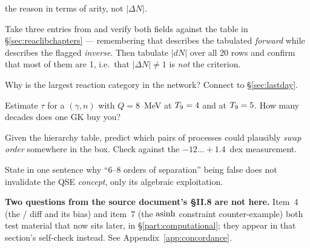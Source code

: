 \begin{selfcheck}
      the reason in terms of arity, not $|\Delta N|$.
\item Take three entries from
       and verify both fields
      against the table in \S\ref{sec:reaclibchapters} --- remembering that
       describes the tabulated \emph{forward} while 
      describes the flagged \emph{inverse}. Then tabulate $|dN|$ over all 20
      rows and confirm that most of them are 1, i.e.\ that
      $|\Delta N| \neq 1$ is \emph{not} the criterion.
\item Why is  the largest reaction category in the network? Connect
      to \S\ref{sec:lastday}.
\item Estimate $\tau$ for a $(\gamma,n)$ with $Q = 8$~MeV at $T_{9} = 4$ and at
      $T_{9} = 5$. How many decades does one GK buy you?
\item Given the hierarchy table, predict which pairs of processes could
      plausibly \emph{swap order} somewhere in the box. Check against the
      $-12\ldots+1.4$~dex measurement.
\item State in one sentence why ``6--8 orders of separation'' being false does
      not invalidate the QSE \emph{concept}, only its algebraic exploitation.
\end{selfcheck}

\begin{aside}
\textbf{Two questions from the source document's \S II.8 are not here.} Item~4
(the / diff and its \Ye{} bias) and item~7 (the $\operatorname{asinh}$
constraint counter-example) both test material that now sits later, in
\S\ref{part:computational}; they appear in that section's self-check instead.
See Appendix~\ref{app:concordance}.
\end{aside}

